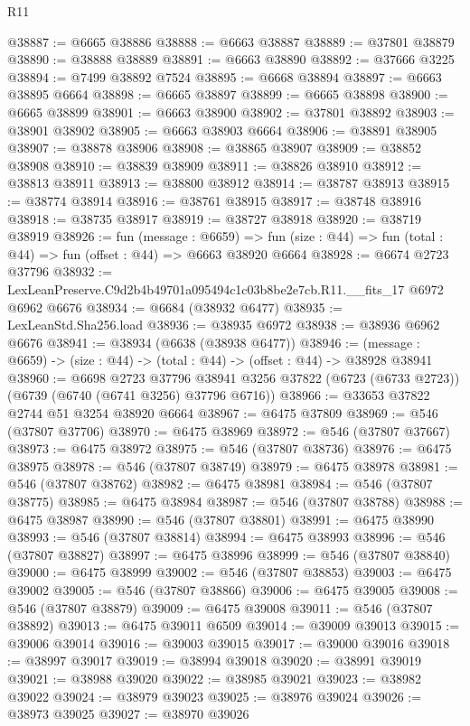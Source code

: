 \begin{lexlean}{R11}
\begin{coremodule}
@38887 := @6665 @38886
@38888 := @6663 @38887
@38889 := @37801 @38879
@38890 := @38888 @38889
@38891 := @6663 @38890
@38892 := @37666 @3225
@38894 := @7499 @38892 @7524
@38895 := @6668 @38894
@38897 := @6663 @38895 @6664
@38898 := @6665 @38897
@38899 := @6665 @38898
@38900 := @6665 @38899
@38901 := @6663 @38900
@38902 := @37801 @38892
@38903 := @38901 @38902
@38905 := @6663 @38903 @6664
@38906 := @38891 @38905
@38907 := @38878 @38906
@38908 := @38865 @38907
@38909 := @38852 @38908
@38910 := @38839 @38909
@38911 := @38826 @38910
@38912 := @38813 @38911
@38913 := @38800 @38912
@38914 := @38787 @38913
@38915 := @38774 @38914
@38916 := @38761 @38915
@38917 := @38748 @38916
@38918 := @38735 @38917
@38919 := @38727 @38918
@38920 := @38719 @38919
@38926 := fun (message : @6659) =>
  fun (size : @44) => fun (total : @44) => fun (offset : @44) => @6663 @38920 @6664
@38928 := @6674 @2723 @37796
@38932 := LexLeanPreserve.C9d2b4b49701a095494c1c03b8be2e7cb.R11.__fits_17 @6972 @6962 @6676
@38934 := @6684 (@38932 @6477)
@38935 := LexLeanStd.Sha256.load
@38936 := @38935 @6972
@38938 := @38936 @6962 @6676
@38941 := @38934 (@6638 (@38938 @6477))
@38946 := (message : @6659) -> (size : @44) -> (total : @44) -> (offset : @44) -> @38928 @38941
@38960 := @6698
    @2723
    @37796
    @38941
    @3256
    @37822
    (@6723 (@6733 @2723))
    (@6739 (@6740 (@6741 @3256) @37796 @6716))
@38966 := @33653 @37822 @2744 @51 @3254 @38920 @6664
@38967 := @6475 @37809
@38969 := @546 (@37807 @37706)
@38970 := @6475 @38969
@38972 := @546 (@37807 @37667)
@38973 := @6475 @38972
@38975 := @546 (@37807 @38736)
@38976 := @6475 @38975
@38978 := @546 (@37807 @38749)
@38979 := @6475 @38978
@38981 := @546 (@37807 @38762)
@38982 := @6475 @38981
@38984 := @546 (@37807 @38775)
@38985 := @6475 @38984
@38987 := @546 (@37807 @38788)
@38988 := @6475 @38987
@38990 := @546 (@37807 @38801)
@38991 := @6475 @38990
@38993 := @546 (@37807 @38814)
@38994 := @6475 @38993
@38996 := @546 (@37807 @38827)
@38997 := @6475 @38996
@38999 := @546 (@37807 @38840)
@39000 := @6475 @38999
@39002 := @546 (@37807 @38853)
@39003 := @6475 @39002
@39005 := @546 (@37807 @38866)
@39006 := @6475 @39005
@39008 := @546 (@37807 @38879)
@39009 := @6475 @39008
@39011 := @546 (@37807 @38892)
@39013 := @6475 @39011 @6509
@39014 := @39009 @39013
@39015 := @39006 @39014
@39016 := @39003 @39015
@39017 := @39000 @39016
@39018 := @38997 @39017
@39019 := @38994 @39018
@39020 := @38991 @39019
@39021 := @38988 @39020
@39022 := @38985 @39021
@39023 := @38982 @39022
@39024 := @38979 @39023
@39025 := @38976 @39024
@39026 := @38973 @39025
@39027 := @38970 @39026

\end{coremodule}
\end{lexlean}
